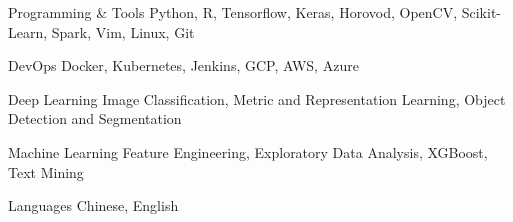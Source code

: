 

\begin{cvskills}

  \cvskill
    {Programming \& Tools} %
    {Python, R, Tensorflow, Keras, Horovod, OpenCV, Scikit-Learn, Spark, Vim, Linux, Git} %

  \cvskill
    {DevOps} %
    {Docker, Kubernetes, Jenkins, GCP, AWS, Azure} %

  \cvskill
    {Deep Learning} %
    {Image Classification, Metric and Representation Learning, Object Detection and Segmentation} %

  \cvskill
    {Machine Learning} %
    {Feature Engineering, Exploratory Data Analysis, XGBoost, Text Mining} %

  \cvskill
    {Languages} %
    {Chinese, English} %

\end{cvskills}
